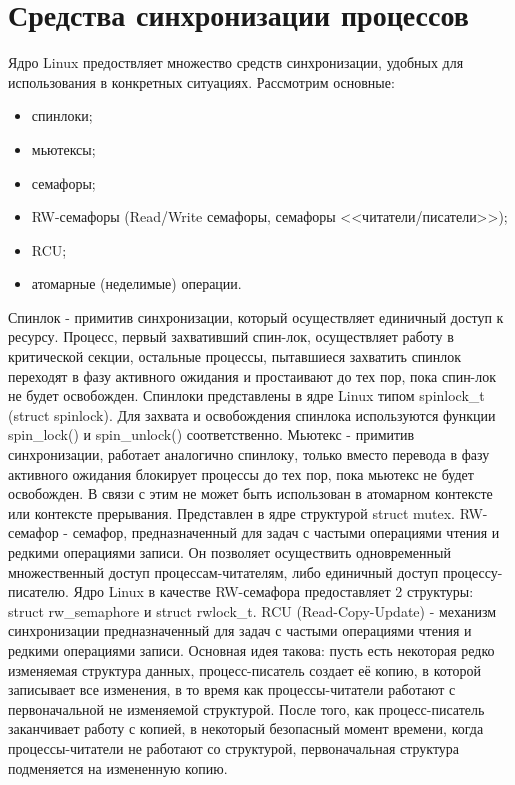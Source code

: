 \documentclass{bmstu}
\begin{document}
\section{Средства синхронизации процессов}
Ядро Linux предоствляет множество средств синхронизации, удобных для использования в конкретных ситуациях. Рассмотрим основные:
\begin{itemize}
	\item спинлоки;
	\item мьютексы;
	\item семафоры;
	\item RW-семафоры (Read/Write семафоры, семафоры <<читатели/писатели>>);
	\item RCU;
	\item атомарные (неделимые) операции.
\end{itemize}
Спинлок - примитив синхронизации, который осуществляет единичный доступ к ресурсу. Процесс, первый захвативший спин-лок, осуществляет работу в критической секции, остальные процессы, пытавшиеся захватить спинлок переходят в фазу активного ожидания и простаивают до тех пор, пока спин-лок не будет освобожден. Спинлоки представлены в ядре Linux типом spinlock\_t (struct spinlock). Для захвата и освобождения спинлока используются функции spin\_lock() и spin\_unlock() соответственно.%
Мьютекс - примитив синхронизации, работает аналогично спинлоку, только вместо перевода в фазу активного ожидания блокирует процессы до тех пор, пока мьютекс не будет освобожден. В связи с этим не может быть использован в атомарном контексте или контексте прерывания. Представлен в ядре структурой struct mutex. %
RW-семафор - семафор, предназначенный для задач с частыми операциями чтения и редкими операциями записи. Он позволяет осуществить одновременный множественный доступ процессам-читателям, либо единичный доступ процессу-писателю. Ядро Linux в качестве RW-семафора предоставляет 2 структуры: struct rw\_semaphore и struct rwlock\_t. %
RCU (Read-Copy-Update) - механизм синхронизации предназначенный для задач с частыми операциями чтения и редкими операциями записи. Основная идея такова: пусть есть некоторая редко изменяемая структура данных, процесс-писатель создает её копию, в которой записывает все изменения, в то время как процессы-читатели работают с первоначальной не изменяемой структурой. После того, как процесс-писатель заканчивает работу с копией, в некоторый безопасный момент времени, когда процессы-читатели не работают со структурой, первоначальная структура подменяется на измененную копию. %
\end{document}

